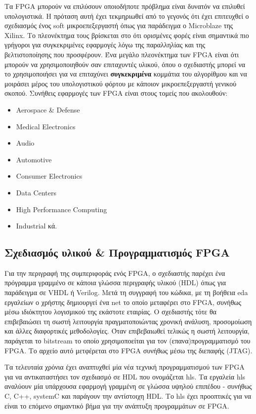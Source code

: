 Τα FPGA μπορούν να επιλύσουν οποιοδήποτε πρόβλημα είναι δυνατόν να επιλυθεί υπολογιστικά. Η πρόταση αυτή έχει τεκμηριωθεί από το γεγονός ότι έχει επιτευχθεί ο σχεδιασμός ένος soft μικροεπεξεργαστή όπως για παράδειγμα ο Microblaze της Xilinx. Το πλεονέκτημα τους βρίσκεται στο ότι ορισμένες φορές είναι σημαντικά πιο γρήγοροι για συγκεκριμένες εφαρμογές λόγω της παραλληλίας και της βελτιστοποίησης που προσφέρουν. Ένα μεγάλο πλεονέκτημα των FPGA είναι ότι μπορούν να χρησιμοποιηθούν σαν επιταχυντές υλικού, όπου ο σχεδιαστής μπορεί να το χρησιμοποιήσει για να επιταχύνει \textbf{συγκεκριμένα} κομμάτια του αλγορίθμου και να μοιράσει μέρος του υπολογιστικού φόρτου με κάποιον μικροεπεξεργαστή γενικού σκοπού. Συνήθεις εφαρμογές των FPGA είναι στους τομείς που ακολουθούν:
\begin{itemize}
  \item Aerospace \& Defense
  \item Medical Electronics
  \item Audio
  \item Automotive
  \item Consumer Electronics
  \item Data Centers
  \item High Performance Computing
  \item Industrial κά. \\
\end{itemize}
\subsection{Σχεδιασμός υλικού \& Προγραμματισμός FPGA}

Για την περιγραφή της συμπεριφοράς ενός FPGA, ο σχεδιαστής παρέχει ένα πρόγραμμα γραμμένο σε κάποια γλώσσα περιγραφής υλικού (HDL) όπως για παράδειγμα σε VHDL ή Verilog. Μετά τη συγγραφή του κώδικα, με τη βοήθεια \gls{eda} εργαλείων ο χρήστης δημιουργεί ένα \gls{net} το οποίο μεταφέρει στο FPGA, συνήθως μέσω ιδιόκτητου λογισμικού της εκάστοτε εταιρίας. Ο σχεδιαστής τότε θα επιβεβαιώσει τη σωστή λειτουργία πραγματοποιώντας χρονική ανάλυση, προσομοίωση και άλλες διαφορτικές μεθοδολογίες. Όταν επιβεβαιωθεί τελικώς η σωστή λειτουργία, παράγεται το bitstream το οποίο χρησιμοποείται για τον (επανα)προγραμματισμό του FPGA. Το αρχείο αυτό μετφέρεται στο FPGA συνήθως μέσω της διεπαφής (JTAG).

Τα τελευταία χρόνια έχει αναπτυχθεί μία νέα τεχνική προγραμματισμού των FPGA για να αντικαταστήσει τον σχεδιασμό σε HDL που ονομάζεται \gls{hls}. Τα εργαλεία \gls{hls} αναλύουν μία υπάρχουσα εφαρμογή γραμμένη σε γλώσσα υψηλού επιπέδου - συνήθως C, C++, systemC και παράγουν την αντίστοιχη HDL. Το \gls{hls} έχει προοπτικές για να είναι το επόμενο σημαντικό βήμα για την ανάπτυξη προγραμμάτων σε FPGA.

